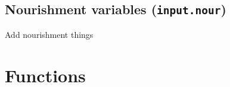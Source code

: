 \documentclass[a4paper, 11pt]{article}
\begin{document}
\subsection{Nourishment variables (\texttt{input.nour})}
\label{subsubsec:in_nour}
Add nourishment things



























































%
%
%
%


\clearpage
\section{Functions}

\end{document}
